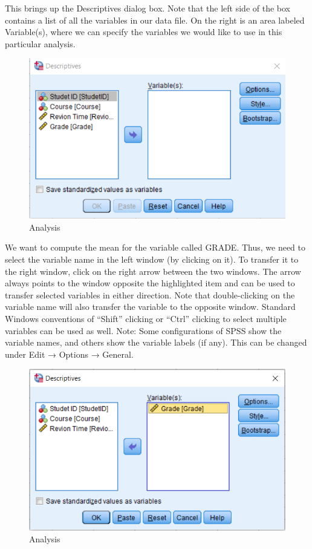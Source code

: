 \documentclass[
]{book}
\begin{document}
This brings up the Descriptives dialog box. Note that the left side of the box contains a list of all the variables in our data file. On the right is an area labeled Variable(s), where we can specify the variables we would like to use in this particular analysis.

\begin{figure}
\centering
\includegraphics{Saveas.png}
\caption{Analysis}
\end{figure}

We want to compute the mean for the variable called GRADE. Thus, we need to select the variable name in the left window (by clicking on it). To transfer it to the right window, click on the right arrow between the two windows. The arrow always points to the window opposite the highlighted item and can be used to transfer selected variables in either direction. Note that double-clicking on the variable name will also transfer the variable to the opposite window. Standard Windows conventions of ``Shift'' clicking or ``Ctrl'' clicking to select multiple variables can be used as well. Note: Some configurations of SPSS show the variable names, and others show the variable labels (if any). This can be changed under Edit → Options → General.

\begin{figure}
\centering
\includegraphics{analyze2.png}
\caption{Analysis}
\end{figure}
\end{document}
